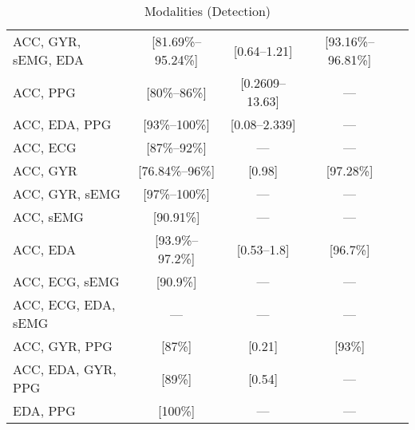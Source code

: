 
\begin{table}
    \caption{Modalities (Detection)}
    \vspace{1em}
    \label{tab:modalities}
    \footnotesize
\begin{tabularx}{\textwidth}{lCCCC}
    
\hline
{} &  &  &  &  \\
\hline
ACC, GYR, sEMG, EDA & [81.69\%--95.24\%] & [0.64--1.21] & [93.16\%--96.81\%] & \cite{Wang2025-ql, Ge2023-ab, Li2022-ty, Wu2024-yl, Wang2022-lt} \\
ACC, PPG & [80\%--86\%] & [0.2609--13.63] & --- & \cite{Ali2020-ke, Tang2021-td, Arends2018-ew, Yu2023-ss} \\
ACC, EDA, PPG & [93\%--100\%] & [0.08--2.339] & --- & \cite{Xu2022-tx, Nasseri2021-xn} \\
ACC, ECG & [87\%--92\%] & --- & --- & \cite{Van_Andel2017-yx, Hegarty-Craver2021-hk} \\
ACC, GYR & [76.84\%--96\%] & [0.98] & [97.28\%] & \cite{Larsen2024-vn, Dong2022-oo} \\
ACC, GYR, sEMG & [97\%--100\%] & --- & --- & \cite{Wang2025-my, Gheryani2017-yg} \\
ACC, sEMG & [90.91\%] & --- & --- & \cite{Milosevic2016-ee} \\
ACC, EDA & [93.9\%--97.2\%] & [0.53--1.8] & [96.7\%] & \cite{Regalia2019-ch, Poh2012-af, Chowdhury2022-bi} \\
ACC, ECG, sEMG & [90.9\%] & --- & --- & \cite{De_Cooman2018-pq} \\
ACC, ECG, EDA, sEMG & --- & --- & --- & \cite{Hamlin2021-sd} \\
ACC, GYR, PPG & [87\%] & [0.21] & [93\%] & \cite{Vakilna2024-hk} \\
ACC, EDA, GYR, PPG & [89\%] & [0.54] & --- & \cite{Jiang2022-zu} \\
EDA, PPG & [100\%] & --- & --- & \cite{Cogan2017-lg}

\end{tabularx}

\end{table}